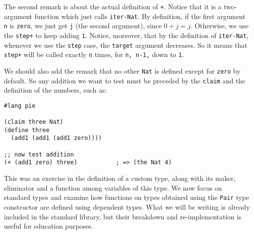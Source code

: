 The second remark is about the actual definition of \texttt{+}. Notice that
it is a two-argument function which just calls \texttt{iter-Nat}. By
definition, if the first argument \texttt{n} is \texttt{zero}, we just get
\texttt{j} (the second argument), since $ 0 + j = j $. Otherwise, we use
the  \texttt{step+} to keep adding \texttt{1}. Notice,
moreover, that by the definition of \texttt{iter-Nat}, whenever we use the
\texttt{step} case, the \texttt{target} argument decreases. So it means that
\texttt{step+} will be called exactly \texttt{n} times, for \texttt{n, n-1,}
down to \texttt{1}.

We should also add the remark that no other \texttt{Nat} is defined except
for \texttt{zero} by default. So any addition we want to test must be
preceded by the \texttt{claim} and the definition of the numbers,
such as:
{
  \small
\begin{verbatim}
#lang pie

(claim three Nat)
(define three
  (add1 (add1 (add1 zero))))

;; now test addition
(+ (add1 zero) three)           ; => (the Nat 4)
\end{verbatim}
}

\vspace{0.3cm}

This was an exercise in the definition of a custom type, along with its
maker, eliminator and a function among variables of this type. We now focus
on standard types and examine how functions on types obtained using the
\texttt{Pair} type constructor are defined using dependent types.
What we will be writing is already included in the standard library, but their
breakdown and re-implementation is useful for education purposes.

